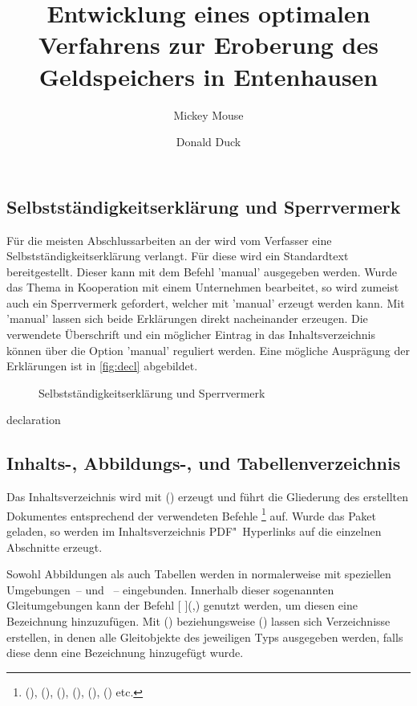 \documentclass[%
  english,ngerman,%
  cdgeometry=no,DIV=12,automark%
]{tudscrartcl}
\begin{document}
\subsection{Selbstständigkeitserklärung und Sperrvermerk}
Für die meisten Abschlussarbeiten an der \TnUD wird vom Verfasser eine 
Selbstständigkeitserklärung verlangt. Für diese wird ein Standardtext 
bereitgestellt. Dieser kann mit dem Befehl 'manual' 
ausgegeben werden. Wurde das Thema in Kooperation mit einem Unternehmen 
bearbeitet, so wird zumeist auch ein Sperrvermerk gefordert, welcher mit 
'manual' erzeugt werden kann. Mit 'manual' 
lassen sich beide Erklärungen direkt nacheinander erzeugen. Die verwendete 
Überschrift und ein möglicher Eintrag in das Inhaltsverzeichnis können über die 
Option 'manual' reguliert werden. Eine mögliche Ausprägung 
der Erklärungen ist in \autoref{fig:decl} abgebildet.
%
\begin{figure}
\centering
{}
\caption{Selbstständigkeitserklärung und Sperrvermerk}
\label{fig:decl}
\end{figure}

\begin{Hint!}{declaration}
\title{%
  Entwicklung eines optimalen Verfahrens zur Eroberung des
  Geldspeichers in Entenhausen
}
\author{Mickey Mouse\and Donald Duck}
\declaration[company=FIRMA]
\end{Hint!}
\begin{Trunk+}
\declaration[company=FIRMA]

\end{Trunk+}

\subsection{Inhalts-, Abbildungs-, und Tabellenverzeichnis}
Das Inhaltsverzeichnis wird mit () 
erzeugt und führt die Gliederung des erstellten Dokumentes entsprechend der 
verwendeten Befehle%
\footnote{%
  (),
  (), 
  (), 
  (), 
  (),
  () etc.%
}
auf. Wurde das Paket  geladen, so werden im 
Inhaltsverzeichnis PDF"~Hyperlinks auf die einzelnen Abschnitte erzeugt.

Sowohl Abbildungen als auch Tabellen werden in  normalerweise 
mit speziellen Umgebungen~--  und ~-- 
eingebunden. Innerhalb dieser sogenannten Gleitumgebungen kann der Befehl 
[%
](,) genutzt werden, um diesen eine 
Bezeichnung hinzuzufügen. Mit () 
beziehungsweise () lassen sich 
Verzeichnisse erstellen, in denen alle Gleitobjekte des jeweiligen Typs 
ausgegeben werden, falls diese denn eine Bezeichnung hinzugefügt wurde. 
\end{document}
